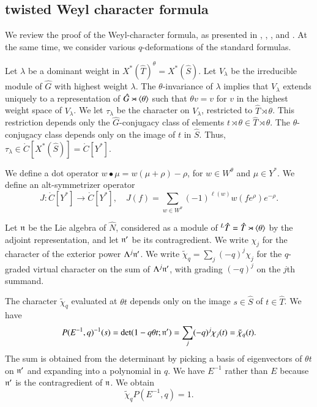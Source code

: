 \subsection{twisted Weyl character formula}

We review the proof of the Weyl-character formula, as presented in \cite{kostant1961lie}, 
\cite{jantzen1977darstellungen}, \cite{wendt2001weyl}, and \cite{kumar2009characters}.
At the same time, we consider various $q$-deformations of the standard formulas.

Let $\lambda$ be a dominant weight in $X^*(\hat T)^\theta = X^*(\hat S)$.  Let $V_\lambda$ be the irreducible module
of $\hat G$ with highest weight $\lambda$.  The $\theta$-invariance of $\lambda$ implies that $V_\lambda$
extends uniquely to a representation of $\hat G \rtimes \langle{\theta}\rangle$ such that $\theta v = v$ for $v$ in the
highest weight space of $V_\lambda$.  We let $\tau_\lambda$ be the character on $V_\lambda$, restricted to $\hat T\rtimes\theta$.
This restriction depends only the $\hat G$-conjugacy class of elements $t\rtimes \theta\in \hat T\rtimes\theta$.
The $\theta$-conjugacy class depends only on the image of $t$ in $\hat S$.  
Thus, $\tau_\lambda\in \ring{C}[X^*(\hat S)] =\ring{C}[Y^*]$.

We define a dot operator $w\bullet \mu = w(\mu+\rho)-\rho$, for $w\in W^\theta$ and $\mu\in Y^*$.
We define an alt-symmetrizer operator
\[
J:\ring{C}[Y^*]\to \ring{C}[Y^*],\quad J(f) = \sum_{w\in W^\theta} (-1)^{\ell(w)} w(f e^\rho) e^{-\rho}.
\]




Let ${\mathfrak n}$ be the Lie algebra of $\hat N$, considered as a module of ${}^L\hat T=\hat T\rtimes\langle{\theta}\rangle$ by the adjoint representation,
and let ${\mathfrak n}'$ be its contragredient.  We write $\chi_j$ for the character of the exterior power $\Lambda^j {\mathfrak n}'$.
  We write $\tilde\chi_q = \sum_j (-q)^j\chi_j$
for the $q$-graded virtual character on the sum of $\Lambda^j {\mathfrak n}'$, with grading $(-q)^j$ on the $j$th summand.  

The character $\tilde\chi_q$ evaluated at $\theta t$ depends only on the image $s\in\hat S$ of $t\in \hat T$.
We have 
\[
P(E^{-1},q)^{-1}(s) = \det(1- q\theta t;{\mathfrak n}') = \sum_j (-q)^j \chi_j(t) = \tilde\chi_q(t).
\]
The sum is obtained from
 the determinant  by picking a basis of eigenvectors of $\theta t$ on ${\mathfrak n}'$ and expanding into a polynomial
in $q$.
We have $E^{-1}$ rather than $E$ because ${\mathfrak n}'$ is the contragredient of ${\mathfrak n}$.
We obtain
\begin{equation}\label{eqn:tilde}
\tilde\chi_q P(E^{-1},q) = 1.
\end{equation}

